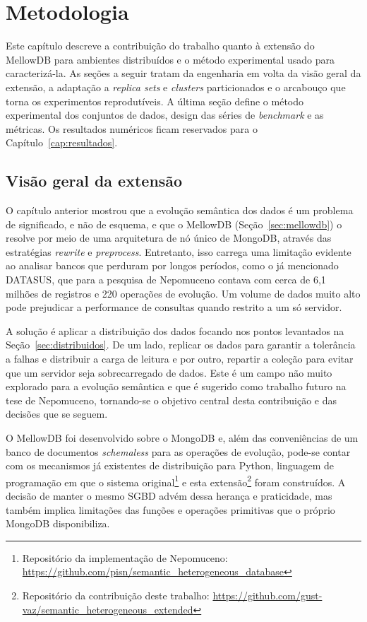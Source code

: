 \chapter{Metodologia}
\label{cap:metodologia}

Este capítulo descreve a contribuição do trabalho quanto à extensão do MellowDB para ambientes distribuídos e o método experimental usado para caracterizá-la. As seções a seguir tratam da engenharia em volta da visão geral da extensão, a adaptação a \textit{replica sets} e \textit{clusters} particionados e o arcabouço que torna os experimentos reprodutíveis. A última seção define o método experimental dos conjuntos de dados, design das séries de \textit{benchmark} e as métricas. Os resultados numéricos ficam reservados para o Capítulo~\ref{cap:resultados}.

\section{Visão geral da extensão}
\label{sec:visao-geral}

O capítulo anterior mostrou que a evolução semântica dos dados é um problema de significado, e não de esquema, e que o MellowDB (Seção~\ref{sec:mellowdb}) o resolve por meio de uma arquitetura de nó único de MongoDB, através das estratégias \textit{rewrite} e \textit{preprocess}. Entretanto, isso carrega uma limitação evidente ao analisar bancos que perduram por longos períodos, como o já mencionado DATASUS, que para a pesquisa de Nepomuceno contava com cerca de 6,1 milhões de registros e 220 operações de evolução. Um volume de dados muito alto pode prejudicar a performance de consultas quando restrito a um só servidor.

A solução é aplicar a distribuição dos dados focando nos pontos levantados na Seção~\ref{sec:distribuidos}. De um lado, replicar os dados para garantir a tolerância a falhas e distribuir a carga de leitura e por outro, repartir a coleção para evitar que um servidor seja sobrecarregado de dados. Este é um campo não muito explorado para a evolução semântica e que é sugerido como trabalho futuro na tese de Nepomuceno, tornando-se o objetivo central desta contribuição e das decisões que se seguem.

O MellowDB foi desenvolvido sobre o MongoDB e, além das conveniências de um banco de documentos \textit{schemaless} \citep{cattell2011} para as operações de evolução, pode-se contar com os mecanismos já existentes de distribuição para Python, linguagem de programação em que o sistema original\footnote{Repositório da implementação de Nepomuceno: \url{https://github.com/pisn/semantic_heterogeneous_database}} e esta extensão\footnote{Repositório da contribuição deste trabalho: \url{https://github.com/gust-vaz/semantic_heterogeneous_extended}} foram construídos. A decisão de manter o mesmo SGBD advém dessa herança e praticidade, mas também implica limitações das funções e operações primitivas que o próprio MongoDB disponibiliza.

